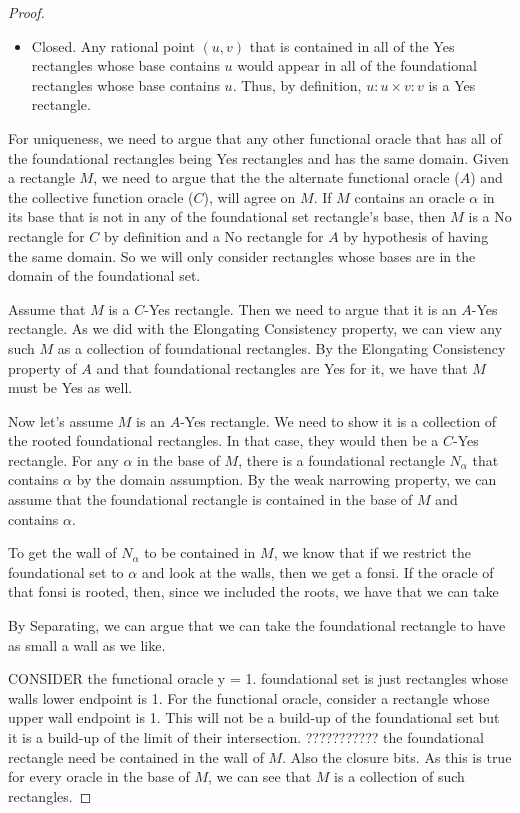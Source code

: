 \documentclass[12pt]{article}
\begin{document}
\begin{proof}
\begin{itemize}
        \item Closed. Any rational point $(u,v)$ that is contained in all of the Yes rectangles whose base contains $u$ would appear in all of the foundational rectangles whose base contains $u$. Thus, by definition, $u:u\times v:v$ is a Yes rectangle. 
    \end{itemize}

    For uniqueness, we need to argue that any other functional oracle that has all of the foundational rectangles being Yes rectangles and has the same domain. Given a rectangle $M$, we need to argue that the the alternate functional oracle ($A$) and the collective function oracle ($C$), will agree on $M$. If $M$ contains an oracle $\alpha$ in its base that is not in any of the foundational set rectangle's base, then $M$ is a No rectangle for $C$ by definition and a No rectangle for $A$ by hypothesis of having the same domain. So we will only consider rectangles whose bases are in the domain of the foundational set.  
    
    Assume that $M$ is a $C$-Yes rectangle. Then we need to argue that it is an $A$-Yes rectangle. As we did with the Elongating Consistency property, we can view any such $M$ as a collection of foundational rectangles. By the Elongating Consistency property of $A$ and that foundational rectangles are Yes for it, we have that $M$ must be Yes as well. 

    Now let's assume $M$ is an $A$-Yes rectangle. We need to show it is a collection of the rooted foundational rectangles. In that case, they  would then be a $C$-Yes rectangle. For any $\alpha$ in the base of $M$, there is a foundational rectangle $N_{\alpha}$ that contains $\alpha$ by the domain assumption. By the weak narrowing property, we can assume that the foundational rectangle is contained in the base of $M$ and contains $\alpha$. 
    
    To get the wall of $N_{\alpha}$ to be contained in $M$, we know that if we restrict the foundational set to $\alpha$ and look at the walls, then we get a fonsi. If the oracle of that fonsi is rooted, then, since we included the roots, we have that we can take 
    
    By Separating, we can argue that we can take the foundational rectangle to have as small a wall as we like.

    
    CONSIDER the functional oracle y = 1. foundational set is just rectangles whose walls lower endpoint is 1. For the functional oracle, consider a rectangle whose upper wall endpoint is 1. This will not be a build-up of the foundational set but it is a build-up of the limit of their intersection. 
    ??????????? the foundational rectangle need be contained in the wall of $M$. Also the closure bits. 
    As this is true for every oracle in the base of $M$, we can see that $M$ is a collection of such rectangles. 
\end{proof}
\end{document}
